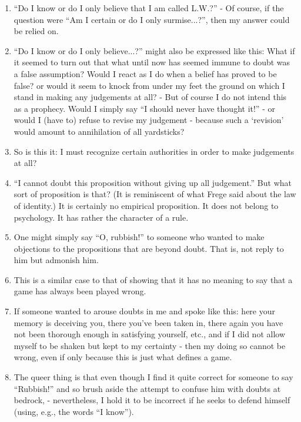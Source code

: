 \documentclass{book}
\begin{document}
\begin{enumerate}
\item
``Do I know or do I only believe that I am called L.W.?'' - Of course, if the
question were ``Am I certain or do I only surmise...?'', then my answer could
be relied on.

\item
``Do I know or do I only believe...?'' might also be expressed like this: What
if it seemed to turn out that what until now has seemed immune to doubt was a
false assumption? Would I react as I do when a belief has proved to be false?
or would it seem to knock from under my feet the ground on which I stand in
making any judgements at all? - But of course I do not intend this as a
prophecy.  Would I simply say ``I should never have thought it!'' - or would I
(have to) refuse to revise my judgement - because such a `revision' would
amount to annihilation of all yardsticks?

\item
So is this it: I must recognize certain authorities in order to make judgements
at all?

\item
``I cannot doubt this proposition without giving up all judgement.'' But what
sort of proposition is that? (It is reminiscent of what Frege said about the
law of identity.) It is certainly no empirical proposition. It does not belong
to psychology. It has rather the character of a rule.

\item
One might simply say ``O, rubbish!'' to someone who wanted to make objections
to the propositions that are beyond doubt. That is, not reply to him but
admonish him.

\item
This is a similar case to that of showing that it has no meaning to say that a
game has always been played wrong.

\item
If someone wanted to arouse doubts in me and spoke like this: here your memory
is deceiving you, there you've been taken in, there again you have not been
thorough enough in satisfying yourself, etc., and if I did not allow myself to
be shaken but kept to my certainty - then my doing so cannot be wrong, even if
only because this is just what defines a game.

\item
The queer thing is that even though I find it quite correct for someone to say
``Rubbish!'' and so brush aside the attempt to confuse him with doubts at
bedrock, - nevertheless, I hold it to be incorrect if he seeks to defend
himself (using, e.g., the words ``I know'').


\end{enumerate}
\end{document}

